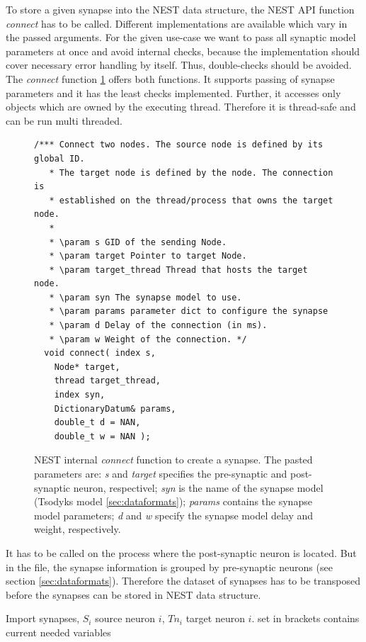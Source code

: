 To store a given synapse into the NEST data structure,
the NEST API function \emph{connect} has to be called.  
Different implementations are available which vary in the passed arguments.
For the given use-case we want to pass all synaptic model parameters at once and
avoid internal checks, because the implementation should cover necessary error handling by 
itself. Thus, double-checks should be avoided.
The \emph{connect} function \ref{code:connect} offers both functions.
It supports passing of synapse parameters and it has the least checks implemented.
Further, it accesses only objects which are owned by the executing thread. 
Therefore it is thread-safe and can be run multi threaded.
\begin{figure}[ht!]
\begin{lstlisting}[style=cppcode]
/*** Connect two nodes. The source node is defined by its global ID.
   * The target node is defined by the node. The connection is
   * established on the thread/process that owns the target node.
   *
   * \param s GID of the sending Node.
   * \param target Pointer to target Node.
   * \param target_thread Thread that hosts the target node.
   * \param syn The synapse model to use.
   * \param params parameter dict to configure the synapse
   * \param d Delay of the connection (in ms).
   * \param w Weight of the connection. */
  void connect( index s,
    Node* target,
    thread target_thread,
    index syn,
    DictionaryDatum& params,
    double_t d = NAN,
    double_t w = NAN );
\end{lstlisting}
\caption{NEST internal \emph{connect} function to create a synapse. The pasted parameters are:
\emph{s} and \emph{target} specifies the pre-synaptic and post-synaptic neuron, respectivel;
\emph{syn} is the name of the synapse model (Tsodyks model \ref{sec:dataformats});
\emph{params} contains the synapse model parameters;
\emph{d} and \emph{w} specify the synapse model delay and weight, respectively.}
\label{code:connect}
\end{figure}
It has to be called on the process where the post-synaptic neuron is located.
But in the file, the synapse information is grouped by pre-synaptic neurons (see section \ref{sec:dataformats}).
Therefore the dataset of synapses has to be transposed before the synapses can be stored in NEST data structure.
\begin{algorithm}[ht!]
	\caption{Import synapses, $S_i$ source neuron $i$, $Tn_i$ target neuron $i$.
	set in brackets contains current needed variables}
\label{alg2}
\end{algorithm}
